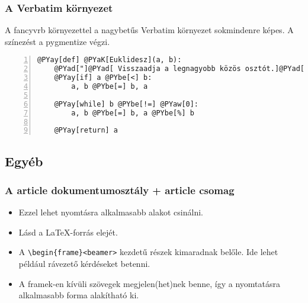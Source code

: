 \documentclass[ignorenonframetext]{beamer}
\newtheorem{definicio}{Definíció}
\begin{document}
\begin{frame}[fragile]
  \frametitle{A Verbatim környezet}

A fancyvrb környezettel a nagybetűs Verbatim környezet sokmindenre
képes. A színezést a pygmentize végzi.\\[2em]

\begin{Verbatim}[commandchars=@\[\],
  numbers=left,
  frame=single, label=\framebox{euklidesz.py}]
@PYay[def] @PYaK[Euklidesz](a, b):
    @PYad["]@PYad[ Visszaadja a legnagyobb közös osztót.]@PYad["]
    @PYay[if] a @PYbe[<] b:
        a, b @PYbe[=] b, a 
    
    @PYay[while] b @PYbe[!=] @PYaw[0]:
        a, b @PYbe[=] b, a @PYbe[%] b
        
    @PYay[return] a
\end{Verbatim}
\end{frame}

\subsection{Egyéb}

%
%
%

\begin{frame}[fragile,<+->]
  \frametitle{A article dokumentumosztály + article csomag}

  \begin{itemize}
    \item Ezzel lehet nyomtásra alkalmasabb alakot csinálni.
    \item Lásd a \LaTeX-forrás elejét.
    \item A \verb|\begin{frame}<beamer>| kezdetű részek kimaradnak
belőle. Ide lehet például rávezető kérdéseket betenni.
    \item A framek-en kívüli szövegek megjelen(het)nek benne, így a
nyomtatásra alkalmasabb forma alakítható ki.
  \end{itemize}
\end{frame}
\end{document}
